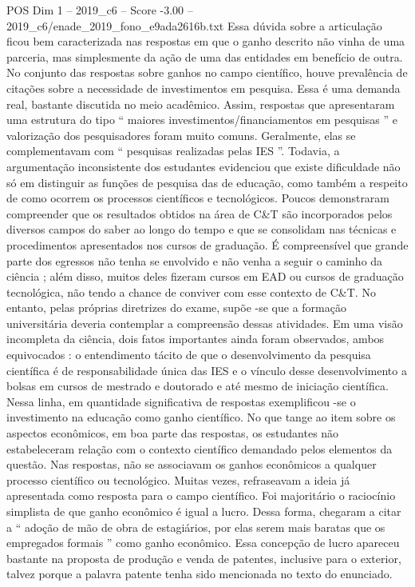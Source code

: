 \begin{textsample}{POS Dim 1 – 2019\_c6 – Score -3.00 – 2019\_c6/enade\_2019\_fono\_e9ada2616b.txt}
Essa dúvida sobre a articulação ficou bem caracterizada nas respostas em que o ganho descrito não vinha de uma parceria, mas simplesmente da ação de uma das entidades em benefício de outra.
No conjunto das respostas sobre ganhos no campo científico, houve prevalência de citações sobre a necessidade de investimentos em pesquisa.
Essa é uma demanda real, bastante discutida no meio acadêmico.
Assim, respostas que apresentaram uma estrutura do tipo “ maiores investimentos/financiamentos em pesquisas ” e valorização dos pesquisadores foram muito comuns.
Geralmente, elas se complementavam com “ pesquisas realizadas pelas IES ”.
Todavia, a argumentação inconsistente dos estudantes evidenciou que existe dificuldade não só em distinguir as funções de pesquisa das de educação, como também a respeito de como ocorrem os processos científicos e tecnológicos.
Poucos demonstraram compreender que os resultados obtidos na área de C\&T são incorporados pelos diversos campos do saber ao longo do tempo e que se consolidam nas técnicas e procedimentos apresentados nos cursos de graduação.
É compreensível que grande parte dos egressos não tenha se envolvido e não venha a seguir o caminho da ciência ; além disso, muitos deles fizeram cursos em EAD ou cursos de graduação tecnológica, não tendo a chance de conviver com esse contexto de C\&T.
No entanto, pelas próprias diretrizes do exame, supõe -se que a formação universitária deveria contemplar a compreensão dessas atividades.
Em uma visão incompleta da ciência, dois fatos importantes ainda foram observados, ambos equivocados : o entendimento tácito de que o desenvolvimento da pesquisa científica é de responsabilidade única das IES e o vínculo desse desenvolvimento a bolsas em cursos de mestrado e doutorado e até mesmo de iniciação científica.
Nessa linha, em quantidade significativa de respostas exemplificou -se o investimento na educação como ganho científico.
No que tange ao item sobre os aspectos econômicos, em boa parte das respostas, os estudantes não estabeleceram relação com o contexto científico demandado pelos elementos da questão.
Nas respostas, não se associavam os ganhos econômicos a qualquer processo científico ou tecnológico.
Muitas vezes, refraseavam a ideia já apresentada como resposta para o campo científico.
Foi majoritário o raciocínio simplista de que ganho econômico é igual a lucro.
Dessa forma, chegaram a citar a “ adoção de mão de obra de estagiários, por elas serem mais baratas que os empregados formais ” como ganho econômico.
Essa concepção de lucro apareceu bastante na proposta de produção e venda de patentes, inclusive para o exterior, talvez porque a palavra patente tenha sido mencionada no texto do enunciado.

\end{textsample}
